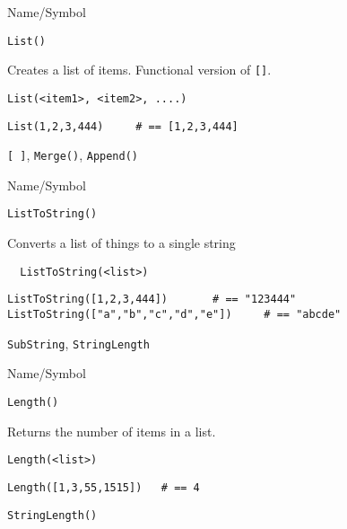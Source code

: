 \rl

\begin{desc}{Name/Symbol}
\item[Name/Symbol]	\verb+List()+

\item[Description]	Creates a list of items. Functional version of \verb+[]+.

\item[Usage]
\begin{verbatim}
List(<item1>, <item2>, ....)
\end{verbatim}

\item[Example]
\begin{verbatim}
List(1,2,3,444)		# == [1,2,3,444]
\end{verbatim}

\item[See Also]	\verb+[ ]+, \verb+Merge()+, \verb+Append()+
\end{desc}

\rl

 
\begin{desc}{Name/Symbol}
\item[Name/Symbol]	\verb+ListToString()+

\item[Description]	Converts a list of things to a single string

\item[Usage]
\begin{verbatim}
  ListToString(<list>)
\end{verbatim}

\item[Example]
\begin{verbatim}
ListToString([1,2,3,444])		# == "123444"
ListToString(["a","b","c","d","e"])		# == "abcde"

\end{verbatim}

\item[See Also] \verb+SubString+, \verb+StringLength+
\end{desc}

\rl


\begin{desc}{Name/Symbol}
\item[Name/Symbol]	\verb+Length()+

\item[Description]	Returns the number of items in a list.

\item[Usage]
\begin{verbatim}
Length(<list>)
\end{verbatim}

\item[Example]
\begin{verbatim}
Length([1,3,55,1515])	# == 4
\end{verbatim}

\item[See Also]	\verb+StringLength()+
\end{desc}

